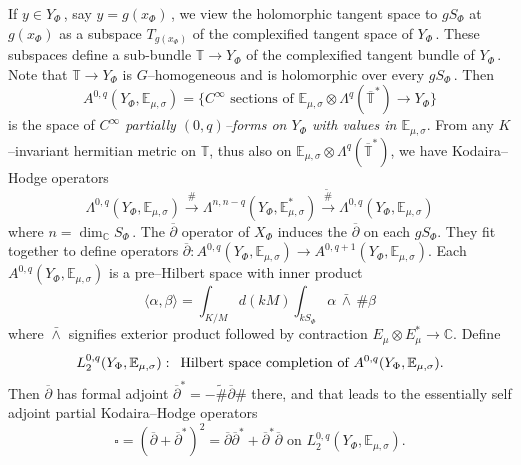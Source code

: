 \documentclass{conm-p-l}
\def\C{\mathbb{C}}
\def\E{\mathbb{E}}
\def\T{\mathbb{T}}
\begin{document}
If $y \in Y_\Phi$\,, say $y = g(x_\Phi)$\,, we view the holomorphic tangent
space to $gS_\Phi$ at $g(x_\Phi)$ as a subspace $T_{g(x_\Phi)}$ of the
complexified tangent space of $Y_\Phi$\,.  These subspaces define a sub-bundle
$\T \to Y_\Phi$ of the complexified tangent bundle of $Y_\Phi$\,.  Note
that $\T \to Y_\Phi$ is $G$--homogeneous and is holomorphic over every
$gS_\Phi$\,.  Then
\begin{equation}\label{1.2.15}
A^{0,q}(Y_\Phi,\E_{\mu,\sigma}) = \{C^\infty \text{ sections of }
	\E_{\mu,\sigma}\otimes \Lambda^q(\overline{\T}^*) \to Y_\Phi\}
\end{equation}
is the space of {\em $C^\infty$ partially $(0,q)$--forms on $Y_\Phi$ with values
in $\E_{\mu,\sigma}$}.  From any $K$--invariant hermitian metric on $\T$,
thus also on $\E_{\mu,\sigma}\otimes \Lambda^q(\overline{\T}^*)$, we
have Kodaira--Hodge operators
\begin{equation}
\Lambda^{0,q}(Y_\Phi,\E_{\mu,\sigma}) \overset{\#}{\longrightarrow}
	\Lambda^{n,n-q}(Y_\Phi,\E_{\mu,\sigma}^*) 
	\overset{\widetilde{\#}}{\longrightarrow}
	\Lambda^{0,q}(Y_\Phi,\E_{\mu,\sigma})
\end{equation}
where $n = \dim_\C S_\Phi$\,.  The $\overline{\partial}$ operator of
$X_\Phi$ induces the $\overline{\partial}$ on each $gS_\Phi$.  They
fit together to define 
operators $\overline{\partial}: A^{0,q}(Y_\Phi,\E_{\mu,\sigma})
\to A^{0,q+1}(Y_\Phi,\E_{\mu,\sigma})$.  Each $A^{0,q}(Y_\Phi,\E_{\mu,\sigma})$
is a pre--Hilbert space with inner product
\begin{equation}
\langle \alpha, \beta \rangle = 
  \int_{K/M}d(kM)\int_{kS_\Phi} \alpha\, \bar\wedge \, \#\beta
\end{equation}
where $\bar\wedge$ signifies exterior product followed by contraction
$E_\mu \otimes E_\mu^* \to \C$.  Define
\begin{equation}\label{1.2.16}
L_2^{0,q}(Y_\Phi,\E_{\mu,\sigma}):\text{\, Hilbert space completion of }
A^{0,q}(Y_\Phi,\E_{\mu,\sigma}).
\end{equation}
Then $\overline{\partial}$ has formal adjoint $\overline{\partial}^* =
-\widetilde{\#} \overline{\partial} \#$ there, and that leads to the
essentially self adjoint {\rm partial Kodaira--Hodge operators}
\begin{equation}\label{1.2.17}
\square = (\overline{\partial} + \overline{\partial}^*)^2 
  = \overline{\partial} \overline{\partial}^* 
	+ \overline{\partial}^* \overline{\partial}
\text{ on } L_2^{0,q}(Y_\Phi,\E_{\mu,\sigma}).
\end{equation}
\end{document}
